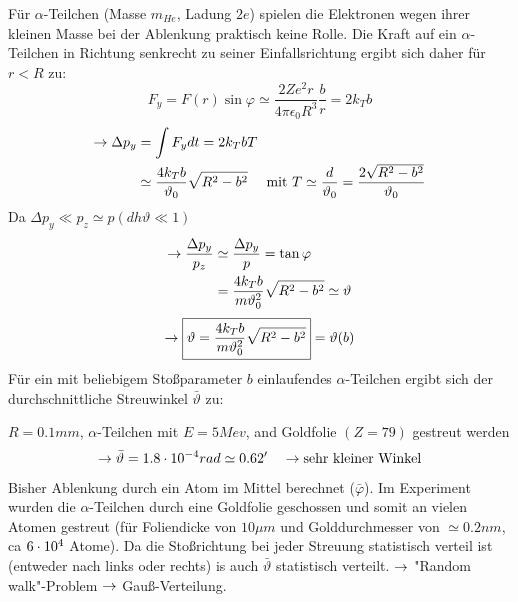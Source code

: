 Für $\alpha$-Teilchen (Masse $m_{He}$, Ladung $2e$) spielen die Elektronen
wegen ihrer kleinen Masse bei der Ablenkung praktisch keine Rolle. Die Kraft
auf ein $\alpha$-Teilchen in Richtung senkrecht zu seiner Einfallsrichtung
ergibt sich daher für $r<R$ zu:
\begin{equation*}
    F_y = F(r) \sin \varphi
    \simeq
    \frac{2 Z e^2 r}{4\pi \epsilon_0 R^3} \frac{b}{r} 
    =
    2k_T b
\end{equation*}
\begin{align*}
    \rightarrow \Delta p_y 
    &=
    \int F_y dt = 2 k_T b T \\
    &\simeq \frac{4 k_T b }{\vartheta_0} \sqrt{R^2 -b^2}
    \quad \text{ mit $T \simeq \frac{d}{\vartheta_0}= \frac{2 \sqrt{R^2 -
    b^2}}{\vartheta_0}$}
\end{align*}
Da $\Delta p_y \ll p_z \simeq p(dh \vartheta \ll 1)$
\begin{align*}
    \rightarrow \frac{\Delta p_y}{p_z} 
    &\simeq \frac{\Delta p_y}{p} = \tan \varphi \\
    &=
    \frac{4 k_T b}{m \vartheta_0^2} \sqrt{R^2 - b^2} \simeq \vartheta
\end{align*}
\begin{equation*}
    \rightarrow \boxed{
    \vartheta = \frac{4 k_T b}{m \vartheta_0^2} \sqrt{R^2 - b^2}
    } = \vartheta(b)
\end{equation*}
Für ein mit beliebigem Stoßparameter $b$ einlaufendes $\alpha$-Teilchen ergibt
sich der durchschnittliche Streuwinkel $\bar{\vartheta}$ zu:
\begin{beis}
    $R=0.1mm$, $\alpha$-Teilchen mit $E=5Mev$, and Goldfolie $(Z=79)$ gestreut
    werden
    \begin{equation*}
        \rightarrow \bar{\vartheta} = 1.8 \cdot 10^{-4} rad \simeq 0.62' \quad
        \rightarrow \text{sehr kleiner Winkel}
    \end{equation*}
\end{beis}
Bisher Ablenkung durch ein Atom im Mittel berechnet ($\bar{\varphi}$). Im Experiment wurden die
$\alpha$-Teilchen durch eine Goldfolie geschossen und somit an vielen Atomen
gestreut (für Foliendicke von $10\mu m$ und Golddurchmesser von $\simeq 0.2 nm$, ca $6 \cdot
10^4$ Atome).
Da die Stoßrichtung bei jeder Streuung  statistisch verteil ist (entweder nach
links oder rechts) is auch $\bar{\vartheta}$ statistisch verteilt. $\rightarrow$
"Random walk"-Problem $\rightarrow$ Gauß-Verteilung.

